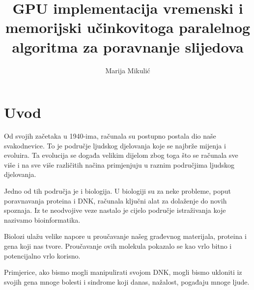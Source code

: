\documentclass[times, utf8, zavrsni]{fer}
\begin{document}

\title{GPU implementacija vremenski i memorijski učinkovitoga paralelnog algoritma za poravnanje slijedova}

\author{Marija Mikulić}

\maketitle

\izvornik


\tableofcontents

\listoftables

\listoffigures

\lstlistoflistings

\chapter{Uvod}

\indent

Od svojih začetaka u 1940-ima, računala su postupno postala dio naše svakodnevice. To je područje ljudskog djelovanja koje se najbrže mijenja i evoluira. Ta evolucija se događa velikim dijelom zbog toga što se računala sve više i na sve više različitih načina primjenjuju u raznim područjima ljudskog djelovanja.

Jedno od tih područja je i biologija. U biologiji su za neke probleme, poput poravnavanja proteina i DNK, računala ključni alat za dolaženje do novih spoznaja. Iz te neodvojive veze nastalo je cijelo područje istraživanja koje nazivamo bioinformatika.

Biolozi ulažu velike napore u proučavanje našeg građevnog materijala, proteina i gena koji nas tvore. Proučavanje ovih molekula pokazalo se kao vrlo bitno i potencijalno vrlo korisno.

Primjerice, ako bismo mogli manipulirati svojom DNK, mogli bismo ukloniti iz svojih gena mnoge bolesti i sindrome koji danas, nažalost, pogađaju mnoge ljude.
\end{document}
